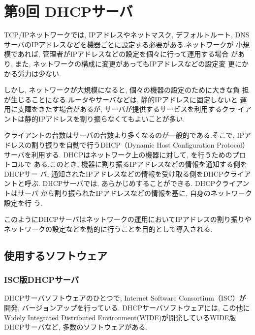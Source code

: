 \section{第9回 DHCPサーバ}
TCP/IPネットワークでは, IPアドレスやネットマスク, デフォルトルート,
DNSサーバのIPアドレスなどを機器ごとに設定する必要がある.ネットワークが
小規模であれば, 管理者がIPアドレスなどの設定を個々に行って運用する場合
があり, また, ネットワークの構成に変更があってもIPアドレスなどの設定変
更にかかる労力は少ない.

しかし, ネットワークが大規模になると, 個々の機器の設定のために大きな負
担が生じることになる.ルータやサーバなどは, 静的IPアドレスに固定しないと
運用に支障をきたす場合があるが, サーバが提供するサービスを利用するクラ
イアントは静的IPアドレスを割り振らなくてもよいことが多い.

クライアントの台数はサーバの台数より多くなるのが一般的である.そこで,
IPアドレスの割り振りを自動で行うDHCP（Dynamic Host Configuration
Protocol）サーバを利用する.  DHCPはネットワーク上の機器に対して,
\textbf{}を行うためのプロトコルで
ある.このとき, 機器に割り振るIPアドレスなどの情報を通知する側をDHCPサー
バ, 通知されたIPアドレスなどの情報を受け取る側をDHCPクライアントと呼ぶ.
DHCPサーバでは, あらかじめ\textbf{}することができる.  DHCPクライアントはサーバ
から割り振られたIPアドレスなどの情報を基に, 自身のネットワーク設定を行
う.

このようにDHCPサーバはネットワークの運用においてIPアドレスの割り振りや
ネットワークの設定などを動的に行うことを目的として導入される.

\subsection*{使用するソフトウェア}
\subsubsection*{ISC版DHCPサーバ}
DHCPサーバソフトウェアのひとつで, Internet Software Consortium（ISC）が開発, バージョンアップを行っている.
DHCPサーバソフトウェアには, この他にWidely Integrated Distributed Environment(WIDE)が開発しているWIDE版DHCPサーバなど, 
多数のソフトウェアがある.
